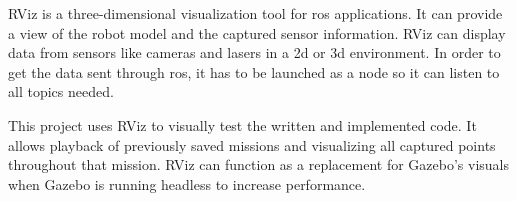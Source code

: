 RViz is a three\hyp{}dimensional visualization tool for \acs{ros} applications. It can provide a view of the robot model and the captured sensor information. RViz can display data from sensors like cameras and lasers in a \acs{2d} or \acs{3d} environment. In order to get the data sent through \acs{ros}, it has to be launched as a node so it can listen to all topics needed. \cite{aws_robomaker_developer_guide}

This project uses RViz to visually test the written and implemented code. It allows playback of previously saved missions and visualizing all captured points throughout that mission. RViz can function as a replacement for Gazebo's visuals when Gazebo is running headless to increase performance.